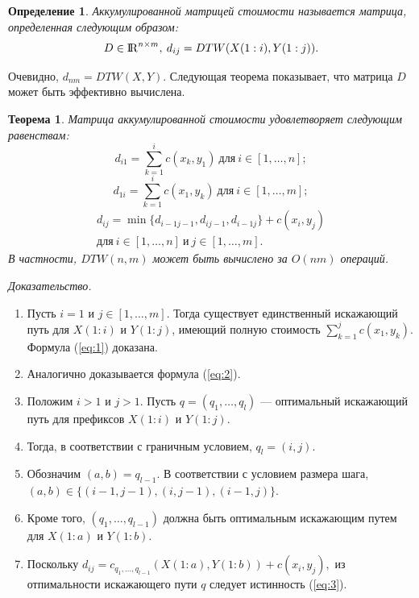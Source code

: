\documentclass[a4paper, 14pt]{extarticle}
\numberwithin{figure}{subsection}
\numberwithin{equation}{subsection}
\newtheorem{theorem}{Теорема}[subsection]
\newtheorem{definition}{Определение}[subsection]
\begin{document}
\begin{definition}
	Аккумулированной матрицей стоимости называется матрица, определенная следующим образом:
\begin{equation}
	D \in {\rm I\!R}^{n \times m},\> d_{ij} = DTW(X(1:i), Y(1:j)).
\end{equation}
\end{definition}

Очевидно, $d_{nm} = DTW(X, Y)$. Следующая теорема показывает, что матрица $D$ может быть эффективно вычислена.

\begin{theorem} \label{thm:1}
	Матрица аккумулированной стоимости удовлетворяет следующим равенствам:
\begin{equation} d_{i1} = \sum_{k=1}^i c(x_k, y_1)\> \text{для}\> i \in [1, \dots, n]; \label{eq:1}\end{equation}
\begin{equation} d_{1i} = \sum_{k=1}^i c(x_1, y_k)\> \text{для}\> i \in [1, \dots, m];\label{eq:2} \end{equation}
\begin{multline}
d_{ij} = \min\{d_{i-1 j-1},d_{i j-1},d_{i-1 j}\} + c(x_i, y_j)\\ \text{для}\> i \in [1, \dots, n]\> \text{и}\> j \in [1, \dots, m]. \label{eq:3}
\end{multline}
В частности, $DTW(n,m)$ может быть вычислено за $O(nm)$ операций.
\end{theorem}
{\it Доказательство.}
\begin{enumerate}
\item Пусть $i=1$ и $j \in [1, \dots, m]$. Тогда существует единственный искажающий путь для $X(1:i)$ и $Y(1:j)$, имеющий полную стоимость $\sum_{k=1}^j c(x_1, y_k)$. Формула (\ref{eq:1}) доказана.
\item Аналогично доказывается формула (\ref{eq:2}).
\item Положим $i > 1$ и $j > 1$. Пусть $q = (q_1, \dots, q_l)$ --- оптимальный искажающий путь для префиксов $X(1:i)$ и $Y(1:j).$
\item Тогда, в соответствии с граничным условием, $q_l = (i, j).$
\item Обозначим $(a, b) = q_{l-1}.$ В соответствии с условием размера шага, $(a, b) \in \{(i-1, j-1),(i,j-1),(i-1,j)\}$.
\item Кроме того, $(q_1, \dots, q_{l-1})$ должна быть оптимальным искажающим путем для $X(1:a)$ и $Y(1:b)$.
\item Поскольку $d_{ij} = c_{q_1, \dots, q_{l-1}}(X(1:a), Y(1:b)) + c(x_i, y_j),$ из отпимальности искажающего пути $q$ следует истинность (\ref{eq:3}).
\end{enumerate}
\end{document}
